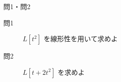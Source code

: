 \begin{frame}{問1・問2}
  \begin{description}
    \item[問1] $L[t^2]$ を線形性を用いて求めよ
    \item[問2] $L[t + 2t^2]$ を求めよ
  \end{description}
\end{frame}

